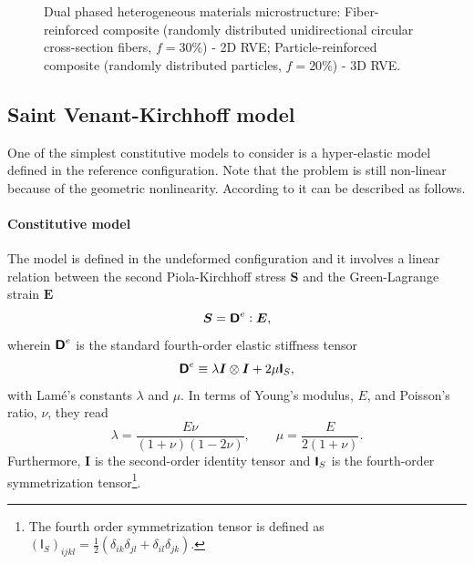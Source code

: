 \begin{figure}[hbt]
\begin{subfigure}[b]{0.45\textwidth}
    \caption{}
    \label{subfig:3d_microstructure}
  \end{subfigure}
  \caption{Dual phased heterogeneous materials microstructure:  Fiber-reinforced composite (randomly distributed unidirectional circular cross-section fibers, \(f=30\%\)) - 2D RVE;  Particle-reinforced composite (randomly distributed particles, \(f=20\%\)) - 3D RVE.}
\label{fig:microstructure}
\end{figure}



\subsection{Saint Venant-Kirchhoff model}

One of the simplest constitutive models to consider is a hyper-elastic model defined in the reference configuration.
Note that the problem is still non-linear because of the geometric nonlinearity.
According to \cite{de_geus_finite_2017} it can be described as follows.

\paragraph{Constitutive model}
The model is defined in the undeformed configuration and it involves a linear relation between the second Piola-Kirchhoff stress \(\boldsymbol{S}\) and the Green-Lagrange strain \(\boldsymbol{E}\)
\begin{equation} \label{eq:saint_venant_constitutive_equation}
\boldsymbol{S}=\boldsymbol{\mathsf{D}}^e: \boldsymbol{E},
\end{equation}
wherein \(\boldsymbol{\mathsf{D}}^e\) is the standard fourth-order elastic stiffness tensor
\begin{equation}
\boldsymbol{\mathsf{D}}^e\equiv\lambda \boldsymbol{I} \otimes \boldsymbol{I}+2 \mu \boldsymbol{\mathsf{I}}_{S},
\end{equation}
with Lamé's constants \(\lambda\) and \(\mu\). In terms of Young's modulus, \(E\), and Poisson's ratio, \(\nu\), they read
\begin{equation}
\lambda=\frac{E \nu}{(1+\nu)(1-2 \nu)}, \qquad \mu=\frac{E}{2(1+\nu)}.
\end{equation}
Furthermore, \(\boldsymbol{I}\) is the second-order identity tensor and \(\boldsymbol{\mathsf{I}}_{S}\) is the fourth-order symmetrization tensor\footnote{The fourth order symmetrization tensor is defined as \({(\mathsf I_S)}_{ijkl} = \frac{1}{2}(\delta_{ik}\delta_{jl} + \delta_{il}\delta_{jk})\).}.

